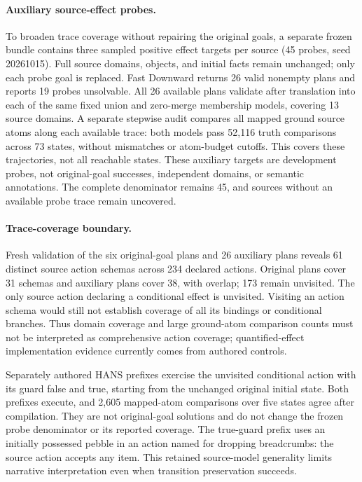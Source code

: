 \documentclass[letterpaper]{article}
\begin{document}
\paragraph{Auxiliary source-effect probes.}
To broaden trace coverage without repairing the original goals, a separate frozen bundle contains three sampled positive effect targets per source (45 probes, seed 20261015). Full source domains, objects, and initial facts remain unchanged; only each probe goal is replaced. Fast Downward returns 26 valid nonempty plans and reports 19 probes unsolvable. All 26 available plans validate after translation into each of the same fixed union and zero-merge membership models, covering 13 source domains. A separate stepwise audit compares all mapped ground source atoms along each available trace: both models pass 52,116 truth comparisons across 73 states, without mismatches or atom-budget cutoffs. This covers these trajectories, not all reachable states. These auxiliary targets are development probes, not original-goal successes, independent domains, or semantic annotations. The complete denominator remains 45, and sources without an available probe trace remain uncovered.

\paragraph{Trace-coverage boundary.}
Fresh validation of the six original-goal plans and 26 auxiliary plans reveals 61 distinct source action schemas across 234 declared actions. Original plans cover 31 schemas and auxiliary plans cover 38, with overlap; 173 remain unvisited. The only source action declaring a conditional effect is unvisited. Visiting an action schema would still not establish coverage of all its bindings or conditional branches. Thus domain coverage and large ground-atom comparison counts must not be interpreted as comprehensive action coverage; quantified-effect implementation evidence currently comes from authored controls.

Separately authored HANS prefixes exercise the unvisited conditional action with its guard false and true, starting from the unchanged original initial state. Both prefixes execute, and 2,605 mapped-atom comparisons over five states agree after compilation. They are not original-goal solutions and do not change the frozen probe denominator or its reported coverage. The true-guard prefix uses an initially possessed pebble in an action named for dropping breadcrumbs: the source action accepts any item. This retained source-model generality limits narrative interpretation even when transition preservation succeeds.
\end{document}
